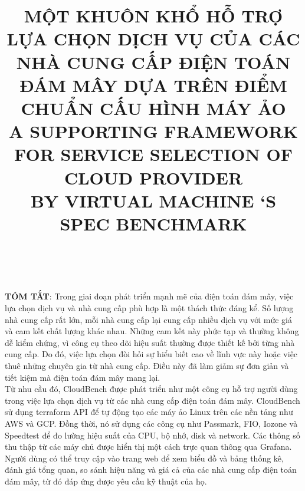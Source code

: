 \documentclass{IEEEtran}
\begin{document}
\title{\large{ \textbf{MỘT KHUÔN KHỔ HỖ TRỢ LỰA CHỌN DỊCH VỤ CỦA CÁC NHÀ CUNG CẤP ĐIỆN TOÁN ĐÁM MÂY DỰA TRÊN ĐIỂM CHUẨN CẤU HÌNH MÁY ẢO}} \\[10pt] 
\normalsize{A SUPPORTING FRAMEWORK FOR SERVICE SELECTION OF CLOUD PROVIDER \\  BY VIRTUAL MACHINE ‘S SPEC BENCHMARK}}
\author{ \\
}

\maketitle



\textbf{TÓM TẮT}: Trong giai đoạn phát triển mạnh mẽ của điện toán đám mây, việc lựa chọn dịch vụ và nhà cung cấp phù hợp là một thách thức đáng kể. Số lượng nhà cung cấp rất lớn, mỗi nhà cung cấp lại cung cấp nhiều dịch vụ với mức giá và cam kết chất lượng khác nhau. Những cam kết này phức tạp và thường không dễ kiểm chứng, vì công cụ theo dõi hiệu suất thường được thiết kế bởi từng nhà cung cấp. Do đó, việc lựa chọn đòi hỏi sự hiểu biết cao về lĩnh vực này hoặc việc thuê những chuyên gia từ nhà cung cấp. Điều này đã làm giảm sự đơn giản và tiết kiệm mà điện toán đám mây mang lại. \\

Từ nhu cầu đó, CloudBench được phát triển như một công cụ hỗ trợ người dùng trong việc lựa chọn dịch vụ từ các nhà cung cấp điện toán đám mây. CloudBench sử dụng terraform API để tự động tạo các máy ảo Linux trên các nền tảng như AWS và GCP. Đồng thời, nó sử dụng các công cụ như Passmark, FIO, Iozone và Speedtest để đo lường hiệu suất của CPU, bộ nhớ, disk và network. Các thông số thu thập từ các máy chủ được hiển thị một cách trực quan thông qua Grafana. Người dùng có thể truy cập vào trang web để xem biểu đồ và bảng thống kê, đánh giá tổng quan, so sánh hiệu năng và giá cả của các nhà cung cấp điện toán đám mây, từ đó đáp ứng được yêu cầu kỹ thuật của họ. \\
\end{document}
